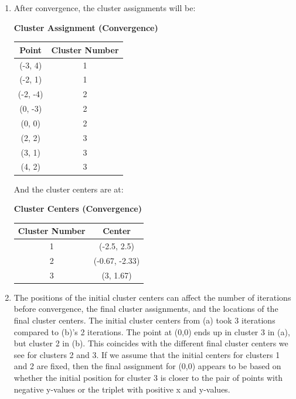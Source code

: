 \documentclass{article}
\begin{document}
\begin{enumerate}
\begin{enumerate}
        \item
        After convergence, the cluster assignments will be:
        \begin{center}
            \textbf{Cluster Assignment (Convergence)} \\
            \begin{tabular}{|c|c|}
            \hline
            Point & Cluster Number \\
            \hline
            (-3, 4) & 1 \\
            \hline
            (-2, 1) & 1 \\
            \hline
            (-2, -4) & 2 \\
            \hline
            (0, -3) & 2 \\
            \hline
            (0, 0) & 2 \\
            \hline
            (2, 2) & 3 \\
            \hline
            (3, 1) & 3 \\
            \hline
            (4, 2) & 3 \\
            \hline
            \end{tabular}
        \end{center}

        And the cluster centers are at:
        \begin{center}
            \textbf{Cluster Centers (Convergence)} \\
            \begin{tabular}{|c|c|}
            \hline
            Cluster Number & Center \\
            \hline
            1 & (-2.5, 2.5) \\
            \hline
            2 & (-0.67, -2.33) \\
            \hline
            3 & (3, 1.67) \\
            \hline
            \end{tabular}
        \end{center}

        \item
        The positions of the initial cluster centers can affect the number of iterations before convergence, the final cluster assignments,
        and the locations of the final cluster centers. The initial cluster centers from (a) took 3 iterations compared to (b)'s
        2 iterations. The point at (0,0) ends up in cluster 3 in (a), but cluster 2 in (b). This coincides with the different final cluster centers
        we see for clusters 2 and 3. If we assume that the initial centers for clusters 1 and 2 are fixed, then the final assignment for (0,0)
        appears to be based on whether the initial position for cluster 3 is closer to the pair of points with negative y-values or the triplet with
        positive x and y-values.


\end{enumerate}
\end{enumerate}
\end{document}
